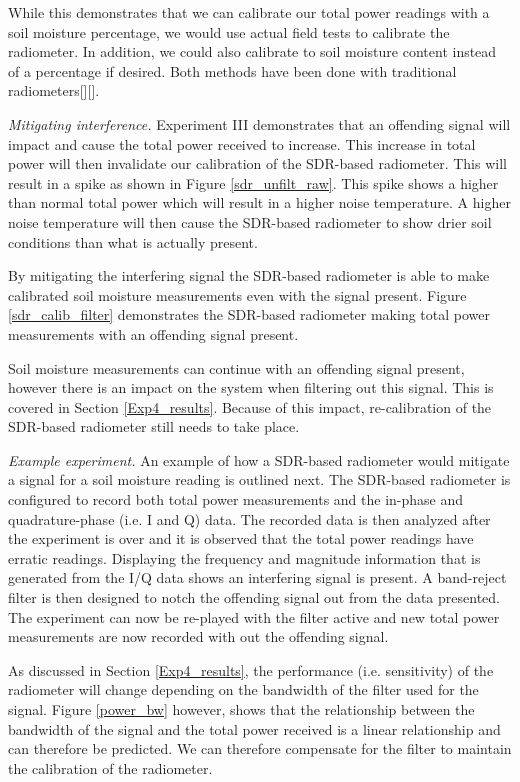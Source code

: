 While this demonstrates that we can calibrate our total power readings with a soil moisture percentage, we would use actual field tests to calibrate the radiometer.  In addition, we could also calibrate to soil moisture content instead of a percentage if desired.  Both methods have been done with traditional radiometers[\cite{Jonard}][\cite{Shi}].

\emph{Mitigating interference.} Experiment III demonstrates that an offending signal will impact and cause the total power received to increase.   This increase in total power will then invalidate our calibration of the SDR-based radiometer.  This will result in a spike as shown in Figure \ref{sdr_unfilt_raw}.  This spike shows a higher than normal total power which will result in a higher noise temperature.  A higher noise temperature will then cause the SDR-based radiometer to show drier soil conditions than what is actually present.

By mitigating the interfering signal the SDR-based radiometer is able to make calibrated soil moisture measurements even with the signal present.  Figure \ref{sdr_calib_filter} demonstrates the SDR-based radiometer making total power measurements with an offending signal present.  

Soil moisture measurements can continue with an offending signal present, however there is an impact on the system when filtering out this signal.  This is covered in Section \ref{Exp4_results}.  Because of this impact, re-calibration of the SDR-based radiometer still needs to take place. 

\emph{Example experiment.}  An example of how a SDR-based radiometer would mitigate a signal for a soil moisture reading is outlined next.  The SDR-based radiometer is configured to record both total power measurements and the in-phase and quadrature-phase (i.e. I and Q) data.  The recorded data is then analyzed after the experiment is over and it is observed that the total power readings have erratic readings.  Displaying the frequency and magnitude information that is generated from the I/Q data shows an interfering signal is present.  A band-reject filter is then designed to notch the offending signal out from the data presented.  The experiment can now be re-played with the filter active and new total power measurements are now recorded with out the offending signal.

As discussed in Section \ref{Exp4_results}, the performance (i.e. sensitivity) of the radiometer will change depending on the bandwidth of the filter used for the signal.  Figure \ref{power_bw} however, shows that the relationship between the bandwidth of the signal and the total power received is a linear relationship and can therefore be predicted.  We can therefore compensate for the filter to maintain the calibration of the radiometer.

